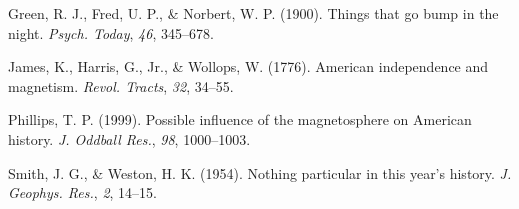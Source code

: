\documentclass[
  12pt,
  letterpaper,
]{report}
\newlength{\cslhangindent}
\newlength{\cslentryspacingunit} %
\newenvironment{CSLReferences}[2] %
 {%
  \setlength{\parindent}{0pt}
  \ifodd #1
  \let\oldpar\par
  \def\par{\hangindent=\cslhangindent\oldpar}
  \fi
  \setlength{\parskip}{#2\cslentryspacingunit}
 }%
 {}
\begin{document}

\onehalfspacing

\hypertarget{refs}{}
\begin{CSLReferences}{1}{0}
\leavevmode{}%
Green, R. J., Fred, U. P., \& Norbert, W. P. (1900). Things that go bump
in the night. \emph{Psych. Today}, \emph{46}, 345--678.

\leavevmode{}%
James, K., Harris, G., Jr., \& Wollops, W. (1776). {American}
independence and magnetism. \emph{Revol. Tracts}, \emph{32}, 34--55.

\leavevmode{}%
Phillips, T. P. (1999). Possible influence of the magnetosphere on
{American} history. \emph{J. Oddball Res.}, \emph{98}, 1000--1003.

\leavevmode{}%
Smith, J. G., \& Weston, H. K. (1954). Nothing particular in this year's
history. \emph{J. Geophys. Res.}, \emph{2}, 14--15.

\end{CSLReferences}
\end{document}
